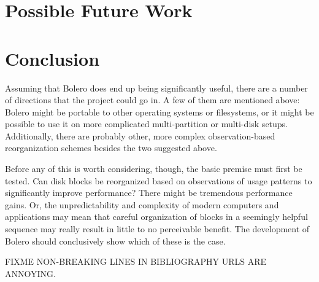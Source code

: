 \documentclass[10pt,twocolumn,letterpaper]{article}
\begin{document}
\section{Possible Future Work}

\section{Conclusion}

Assuming that Bolero does end up being significantly useful, there are a number of directions that
the project could go in. A few of them are mentioned above: Bolero might be portable to other
operating systems or filesystems, or it might be possible to use it on more complicated multi-partition
or multi-disk setups. Additionally, there are probably other, more complex observation-based reorganization schemes
besides the two suggested above.

Before any of this is worth considering, though, the basic premise must first be tested. Can disk
blocks be reorganized based on observations of usage patterns to significantly improve performance?
There might be tremendous performance gains. Or, the unpredictability and complexity of modern
computers and applications may mean that careful organization of blocks in a seemingly helpful
sequence may really result in little to no perceivable benefit. The development of Bolero should conclusively
show which of these is the case.

FIXME NON-BREAKING LINES IN BIBLIOGRAPHY URLS ARE ANNOYING.

{}

\end{document}
